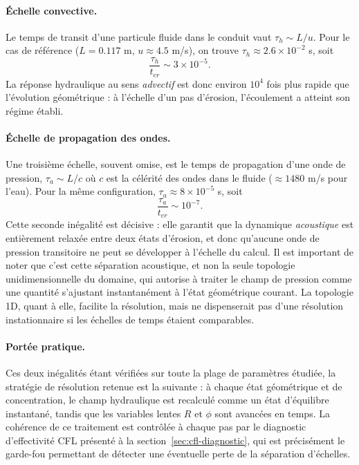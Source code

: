 \documentclass[11pt,a4paper]{report}
\newcommand{\ter}{{t_{er}}}
\begin{document}
\paragraph{Échelle convective.} Le temps de transit d'une particule fluide dans le conduit vaut
\(\tau_h \sim L/u\). Pour le cas de référence (\(L = 0.117\) m, \(u \approx 4.5\) m/s), on trouve
\(\tau_h \approx 2.6\times10^{-2}\) s, soit
\begin{equation}
\frac{\tau_h}{\ter} \sim 3\times10^{-5} .
\label{eq:rapport-tau}
\end{equation}
La réponse hydraulique au sens \emph{advectif} est donc environ \(10^4\) fois plus rapide que
l'évolution géométrique : à l'échelle d'un pas d'érosion, l'écoulement a atteint son régime établi.

\paragraph{Échelle de propagation des ondes.} Une troisième échelle, souvent omise, est le temps de
propagation d'une onde de pression, \(\tau_a \sim L/c\) où \(c\) est la célérité des ondes dans le
fluide (\(\approx 1480\) m/s pour l'eau). Pour la même configuration, \(\tau_a \approx 8\times10^{-5}\) s,
soit
\begin{equation}
\frac{\tau_a}{\ter} \sim 10^{-7} .
\label{eq:rapport-ta}
\end{equation}
Cette seconde inégalité est décisive : elle garantit que la dynamique \emph{acoustique} est entièrement
relaxée entre deux états d'érosion, et donc qu'aucune onde de pression transitoire ne peut se
développer à l'échelle du calcul. Il est important de noter que c'est cette séparation acoustique, et
non la seule topologie unidimensionnelle du domaine, qui autorise à traiter le champ de pression comme
une quantité s'ajustant instantanément à l'état géométrique courant. La topologie 1D, quant à elle,
facilite la résolution, mais ne dispenserait pas d'une résolution instationnaire si les échelles de
temps étaient comparables.

\paragraph{Portée pratique.} Ces deux inégalités étant vérifiées sur toute la plage de paramètres
étudiée, la stratégie de résolution retenue est la suivante : à chaque état géométrique et de
concentration, le champ hydraulique est recalculé comme un état d'équilibre instantané, tandis que les
variables lentes \(R\) et \(\phi\) sont avancées en temps. La cohérence de ce traitement est contrôlée à
chaque pas par le diagnostic d'effectivité CFL présenté à la section~\ref{sec:cfl-diagnostic}, qui est
précisément le garde-fou permettant de détecter une éventuelle perte de la séparation d'échelles.
\end{document}
